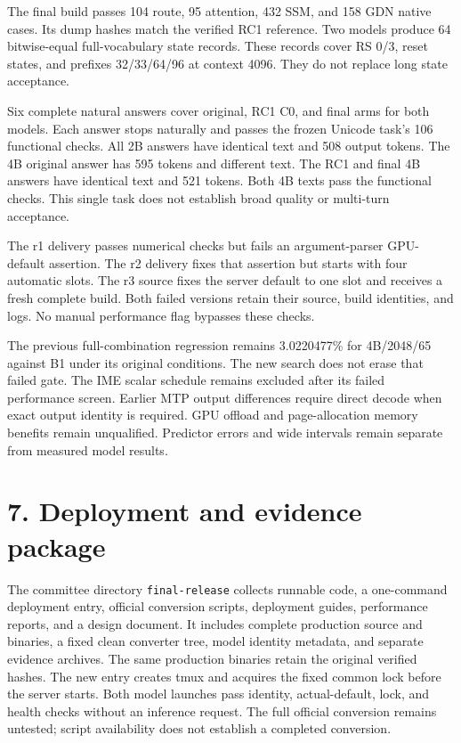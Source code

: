 \documentclass[10pt,a4paper]{article}
\begin{document}
The final build passes 104 route, 95 attention, 432 SSM, and 158 GDN
native cases. Its dump hashes match the verified RC1 reference. Two
models produce 64 bitwise-equal full-vocabulary state records. These
records cover RS 0/3, reset states, and prefixes 32/33/64/96 at context
4096. They do not replace long state acceptance.

Six complete natural answers cover original, RC1 C0, and final arms for
both models. Each answer stops naturally and passes the frozen Unicode
task's 106 functional checks. All 2B answers have identical text and 508
output tokens. The 4B original answer has 595 tokens and different text.
The RC1 and final 4B answers have identical text and 521 tokens. Both 4B
texts pass the functional checks. This single task does not establish
broad quality or multi-turn acceptance.

The r1 delivery passes numerical checks but fails an argument-parser
GPU-default assertion. The r2 delivery fixes that assertion but starts
with four automatic slots. The r3 source fixes the server default to one
slot and receives a fresh complete build. Both failed versions retain
their source, build identities, and logs. No manual performance flag
bypasses these checks.

The previous full-combination regression remains 3.0220477\% for
4B/2048/65 against B1 under its original conditions. The new search does
not erase that failed gate. The IME scalar schedule remains excluded
after its failed performance screen. Earlier MTP output differences
require direct decode when exact output identity is required. GPU
offload and page-allocation memory benefits remain unqualified.
Predictor errors and wide intervals remain separate from measured model
results.

\hypertarget{deployment-and-evidence-package}{%
\section{7. Deployment and evidence
package}\label{deployment-and-evidence-package}}

The committee directory \nolinkurl{final-release} collects runnable
code, a one-command deployment entry, official conversion scripts,
deployment guides, performance reports, and a design document. It
includes complete production source and binaries, a fixed clean
converter tree, model identity metadata, and separate evidence archives.
The same production binaries retain the original verified hashes. The
new entry creates tmux and acquires the fixed common lock before the
server starts. Both model launches pass identity, actual-default, lock,
and health checks without an inference request. The full official
conversion remains untested; script availability does not establish a
completed conversion.
\end{document}
